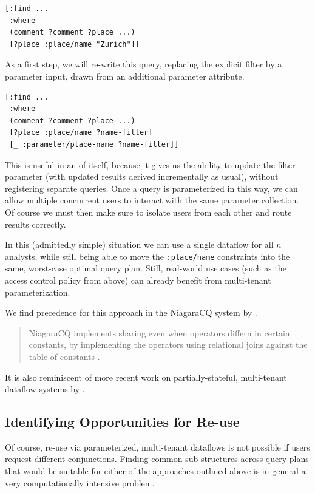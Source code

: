 \documentclass[../catalog.tex]{subfiles}
\begin{document}
\begin{lstlisting}[language=datalog, style=colorlog]
[:find ...
 :where
 (comment ?comment ?place ...)
 [?place :place/name "Zurich"]]
\end{lstlisting}

As a first step, we will re-write this query, replacing the explicit
filter by a parameter input, drawn from an additional parameter
attribute.

\begin{lstlisting}[language=datalog, style=colorlog]
[:find ...
 :where
 (comment ?comment ?place ...)
 [?place :place/name ?name-filter]
 [_ :parameter/place-name ?name-filter]]
\end{lstlisting}

This is useful in an of itself, because it gives us the ability to
update the filter parameter (with updated results derived
incrementally as usual), without registering separate queries. Once a
query is parameterized in this way, we can allow multiple concurrent
users to interact with the same parameter collection. Of course we
must then make sure to isolate users from each other and route results
correctly.

In this (admittedly simple) situation we can use a single dataflow for
all $n$ analysts, while still being able to move the
\texttt{:place/name} constraints into the same, worst-case optimal
query plan. Still, real-world use cases (such as the access control
policy from above) can already benefit from multi-tenant
parameterization.

We find precedence for this approach in the NiagaraCQ system by
\cite{chen2000niagaracq}.

\begin{quote}
NiagaraCQ implements sharing even when operators differn in certain
constants, by implementing the operators using relational joins
against the table of constants \cite{chen2000niagaracq}.

\cite{hirzel2014catalog}
\end{quote}

It is also reminiscent of more recent work on partially-stateful,
multi-tenant dataflow systems by \cite{gjengset2018noria}.

\subsection{Identifying Opportunities for Re-use}

Of course, re-use via parameterized, multi-tenant dataflows is not
possible if users request different conjunctions. Finding common
sub-structures across query plans that would be suitable for either of
the approaches outlined above is in general a very computationally
intensive problem.
\end{document}
